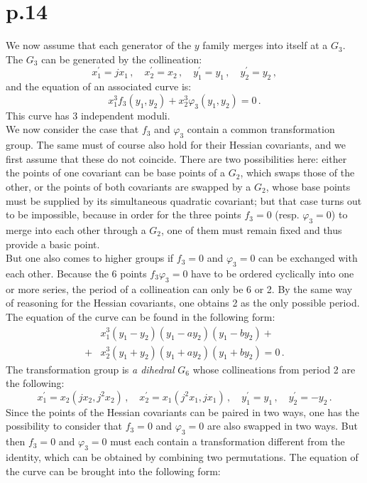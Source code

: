 \documentclass[leqno]{article}
\begin{document}
\section{p.14}
We now assume that each generator of the $y$ family merges into itself at a $G_3$. The $G_3$ can be generated by the collineation:
\[
x_1^\prime = j x_1 \, , \quad x_2^\prime = x_2 \, , \quad y_1^\prime = y_1 \, , \quad y_2^\prime = y_2 \, ,
\]
and the equation of an associated curve is:
\begin{equation}\label{eq: 5.9}
x_1^3 f_3 (y_1, y_2) + x_2^3 \varphi_3 (y_1, y_2) = 0 \, . \tag{9}
\end{equation}
This curve has 3 independent moduli. \\
We now consider the case that $f_3$ and $\varphi_3$ contain a common transformation group. The same must of course also hold for their Hessian covariants, and we first assume that these do not coincide. There are two possibilities here: either the points of one covariant can be base points of a $G_2$, which swaps those of the other, or the points of both covariants are swapped by a $G_2$, whose base points must be supplied by its simultaneous quadratic covariant; but that case turns out to be impossible, because in order for the three points $f_3=0$ (resp. $\varphi_3=0$) to merge into each other through a $G_2$, one of them must remain fixed and thus provide a basic point. \\
But one also comes to higher groups if $f_3=0$ and $\varphi_3=0$ can be exchanged with each other. Because the 6 points $f_3 \varphi_3 = 0$ have to be ordered cyclically into one or more series, the period of a collineation can only be 6 or 2.
By the same way of reasoning for the Hessian covariants, one obtains 2 as the only possible period. The equation of the curve can be found in the following form:
\begin{align}\label{eq: 5.10}
 & x_1^3(y_1 - y_2)(y_1 - ay_2)(y_1 - b y_2) + \tag{10}\\ 
 +& x_2^3(y_1 + y_2)(y_1 + a y_2) (y_1 + b y_2) = 0 \, . \nonumber 
\end{align}
The transformation group is \textit{a dihedral} $G_6$ whose collineations from period 2 are the following:
\[
x_1^\prime = x_2 (j x_2, j^2 x_2) \, , \quad x_2^\prime = x_1 (j^2 x_1 , j x_1) \, , \quad y_1^\prime = y_1 \, , \quad y_2^\prime = - y_2 \, . 
\]
Since the points of the Hessian covariants can be paired in two ways, one has the possibility to consider that $f_3 = 0$ and $\varphi_3 = 0$ are also swapped in two ways. But then $f_3=0$ and $\varphi_3=0$ must each contain a transformation different from the identity, which can be obtained by combining two permutations. The equation of the curve can be brought into the following form:
\end{document}
